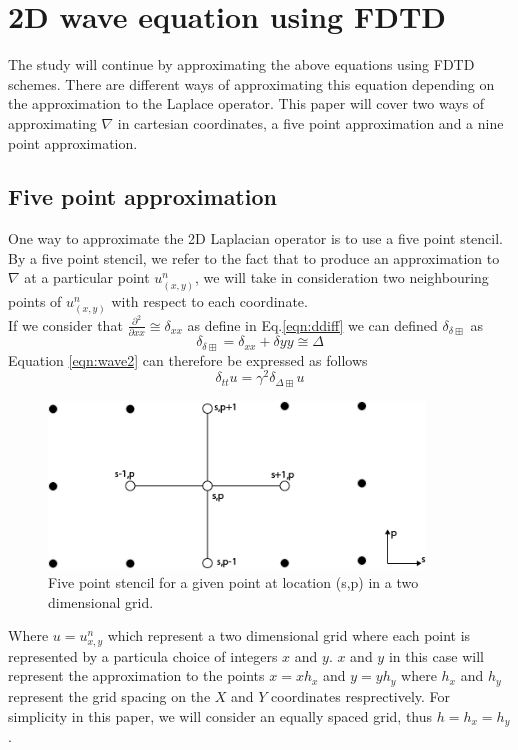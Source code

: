 \section{2D wave equation using FDTD}
\label{chapter3:sec1}
The study will continue by approximating the above equations using FDTD schemes. There are different ways of approximating this equation depending on the approximation to the Laplace operator. This paper will cover two ways of approximating $\nabla$ in cartesian coordinates, a five point approximation and a nine point approximation.
\subsection{Five point approximation}
\label{chapter3:sec1:ssec1}
One way to approximate the 2D Laplacian operator is to use a five point stencil. By a five point stencil, we refer to the fact that to produce an approximation to $\nabla$ at a particular point $u_{(x,y)}^{n}$, we will take in consideration two neighbouring points of $u_{(x,y)}^{n}$ with respect to each coordinate.\\
If we consider that $\frac{\partial^{2}}{\partial xx}\cong\delta_{xx}$ as define in Eq.\ref{eqn:ddiff} we can defined $\delta_{\delta\boxplus}$ as
\begin{equation}
	\delta_{\delta\boxplus}=\delta_{xx}+\delta{yy}\cong \Delta
\end{equation}
Equation \ref{eqn:wave2} can therefore be expressed as follows
\begin{equation}
	\delta_{tt}u=\gamma^{2}\delta_{\Delta\boxplus}u
\end{equation}
\begin{figure}[tb!]
\begin{center}
\includegraphics[width=10cm]{../Chapter_3/_Figs/5point.png}
\caption{Five point stencil for a given point at location (s,p) in a two dimensional grid.}
\label{figs:5point}
\end{center}
\end{figure}
Where $u=u^{n}_{x,y}$  which represent a two dimensional grid where each point is represented by a particula choice of integers $x$ and $y$. $x$ and $y$ in this case will represent the approximation to the points $x=xh_{x}$ and $y=yh_{y}$ where $h_{x}$ and $h_{y}$ represent the grid spacing on the $X$ and $Y$ coordinates resprectively. For simplicity in this paper, we will consider an equally spaced grid, thus $h=h_{x}=h_{y}$.\\
